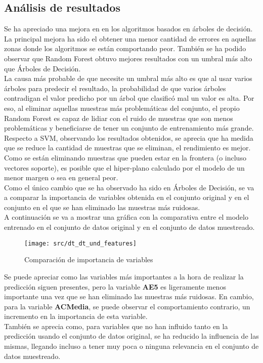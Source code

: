 \subsection{Análisis de resultados}
Se ha apreciado una mejora en en los algoritmos basados en árboles de decisión. La principal mejora ha sido el obtener una menor cantidad de errores en aquellas zonas donde los algoritmos se están comportando peor. También se ha podido observar que Random Forest obtuvo mejores resultados con un umbral más alto que Árboles de Decisión. \\
La causa más probable de que necesite un umbral más alto es que al usar varios árboles para predecir el resultado, la probabilidad de que varios árboles contradigan el valor predicho por un árbol que clasificó mal un valor es alta. Por eso, al eliminar aquellas muestras más problemáticas del conjunto, el propio Random Forest es capaz de lidiar con el ruido de muestras que son menos problemáticas y beneficiarse de tener un conjunto de entrenamiento más grande.\\
\linebreak
Respecto a SVM, observando los resultados obtenidos, se aprecia que ha medida que se reduce la cantidad de muestras que se eliminan, el rendimiento es mejor.
Como se están eliminando muestras que pueden estar en la frontera (o incluso vectores soporte), es posible que el hiper-plano calculado por el modelo de un menor margen o sea en general peor.\\
\linebreak
Como el único cambio que se ha observado ha sido en Árboles de Decisión, se va a comparar la importancia de variables obtenida en el conjunto original y en el conjunto en el que se han eliminado las muestras más ruidosas.\\
\linebreak
A continuación se va a mostrar una gráfica con la comparativa entre el modelo entrenado en el conjunto de datos original y en el conjunto de datos muestreado.
\clearpage
\begin{figure}[H]
	\centering
	\texttt{[image: src/dt\_dt\_und\_features]}
	\caption{Comparación de importancia de variables}
	\label{fig:cmp_fi_dt}
\end{figure}
Se puede apreciar como las variables más importantes a la hora de realizar la predicción siguen presentes, pero la variable \textbf{AE5} es ligeramente menos importante una vez que se han eliminado las muestras más ruidosas. En cambio, para la variable \textbf{ACMedia}, se puede observar el comportamiento contrario, un incremento en la importancia de esta variable. \\
\linebreak
También se aprecia como, para variables que no han influido tanto en la predicción usando el conjunto de datos original, se ha reducido la influencia de las mismas, llegando incluso a tener muy poca o ninguna relevancia en el conjunto de datos muestreado.